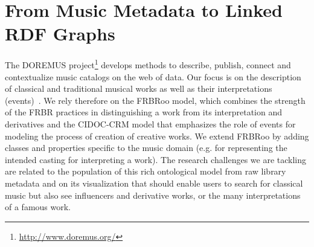 \documentclass[runningheads,a4paper]{llncs}
\begin{document}
\section{From Music Metadata to Linked RDF Graphs}
\label{sec:conversion}
The DOREMUS project\footnote{\url{http://www.doremus.org/}} develops methods to describe, publish, connect and contextualize music catalogs on the web of data. Our focus is on the description of classical and traditional musical works as well as their interpretations (events)~\cite{achichi2015doremus}. We rely therefore on the FRBRoo model, which combines the strength of the FRBR practices in distinguishing a work from its interpretation and derivatives and the CIDOC-CRM model that emphasizes the role of events for modeling the process of creation of creative works. We extend FRBRoo by adding classes and properties specific to the music domain (e.g. for representing the intended casting for interpreting a work). The research challenges we are tackling are related to the population of this rich ontological model from raw library metadata and on its visualization that should enable users to search for classical music but also see influencers and derivative works, or the many interpretations of a famous work.
\end{document}
